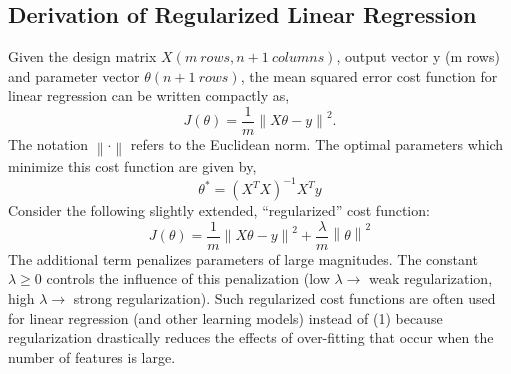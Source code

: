 \documentclass[a4paper]{article}
\begin{document}
\subsection{Derivation of Regularized Linear Regression}
Given the design matrix $X (m~ rows, n + 1~ columns)$, output vector y (m rows) and parameter vector $\theta (n + 1 ~ rows)$, the mean squared error cost function for linear regression can be written compactly as,
\[
J(\theta)=\frac{1}{m}\left\|{X\theta-y}\right\|^2.
\]The notation $\left\|\cdot\right\| $ refers to the Euclidean norm. The optimal parameters which minimize this cost function are given by,\[
\theta^*= (X^TX)^{-1}X^Ty
\]Consider the following slightly extended, “regularized” cost function:
\[
J(\theta)=\frac{1}{m}\left\|{X\theta-y}\right\|^2 + \frac{\lambda}{m}\left\|\theta\right\|^2
\]
The additional term penalizes parameters of large magnitudes. The constant $\lambda \geq 0$ controls the influence of this penalization (low $\lambda \rightarrow$ weak regularization, high $\lambda \rightarrow $ strong regularization). Such regularized cost functions are often used for linear regression (and other learning models) instead of (1) because regularization drastically reduces the effects of over-fitting that occur when the number of features is large.
\end{document}
